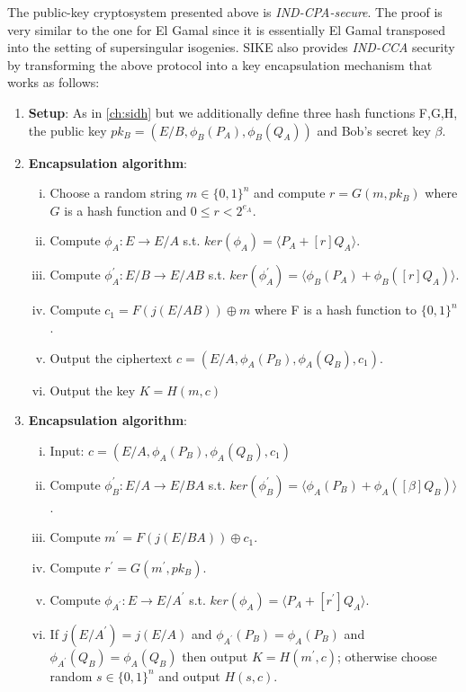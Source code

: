 The public-key cryptosystem presented above is \textit{IND-CPA-secure}. The proof is very similar to the one for El Gamal since it is essentially El Gamal transposed into the setting of supersingular isogenies. SIKE also provides \textit{IND-CCA} security by transforming the above protocol into a key encapsulation mechanism that works as follows:

\begin{enumerate}[(1)]
	\item \textbf{Setup}: As in \ref{ch:sidh} but we additionally define three hash functions F,G,H, the public key $pk_B=(E/B,\phi_B(P_A),\phi_B(Q_A))$ and Bob's secret key $\beta$.
	\item \textbf{Encapsulation algorithm}: 
	\begin{enumerate}[(i)]
		\item Choose a random string $m\in\{0,1\}^n$ and compute $r=G(m,pk_B)$ where $G$ is a hash function and $0\leq r < 2^{e_A}$.
		\item Compute $\phi_A:E \to E/A$ s.t. $ker(\phi_A) = \langle P_A + [r]Q_A \rangle$.
		\item Compute $\phi^{\prime}_A: E/B \to E/AB$ s.t. $ker(\phi^{\prime}_A) = \langle \phi_B(P_A) + \phi_B([r]Q_A) \rangle$.
		\item Compute $c_1=F(j(E/AB))\oplus m$ where F is a hash function to $\{0,1\}^n$.
		\item Output the ciphertext $c=(E/A,\phi_A(P_B),\phi_A(Q_B),c_1)$.
		\item Output the key $K=H(m,c)$
	\end{enumerate}
	\item \textbf{Encapsulation algorithm}: 
	\begin{enumerate}[(i)]
		\item Input: $c=(E/A,\phi_A(P_B),\phi_A(Q_B),c_1)$
		\item Compute $\phi^{\prime}_B: E/A \to E/BA$ s.t. $ker(\phi^{\prime}_B) = \langle \phi_A(P_B) + \phi_A([\beta]Q_B) \rangle$.
		\item Compute $m^{\prime}=F(j(E/BA))\oplus c_1$.
		\item Compute $r^{\prime}=G(m^{\prime},pk_B)$.
		\item Compute $\phi_{A^{\prime}}:E \to E/A^{\prime}$ s.t. $ker(\phi_A) = \langle P_A + [r^{\prime}]Q_A \rangle$.
		\item If $j(E/A^{\prime})=j(E/A)$ and $\phi_{A^{\prime}}(P_B) = \phi_{A}(P_B)$ and $\phi_{A^{\prime}}(Q_B) = \phi_{A}(Q_B)$ then output $K=H(m^{\prime},c)$; otherwise choose random $s\in\{0,1\}^n$ and output $H(s,c)$.

	\end{enumerate}
	
\end{enumerate}

